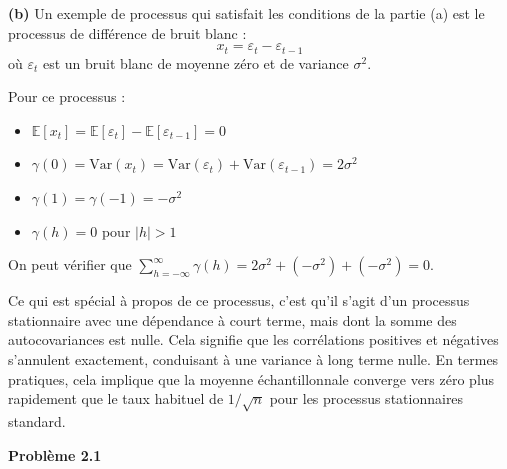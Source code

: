 \documentclass{homework}
\begin{document}
\textbf{(b)} Un exemple de processus qui satisfait les conditions de la partie (a) est le processus de différence de bruit blanc :
\[ x_t = \varepsilon_t - \varepsilon_{t-1} \]
où $\varepsilon_t$ est un bruit blanc de moyenne zéro et de variance $\sigma^2$.

Pour ce processus :
\begin{itemize}
    \item $\mathbb{E}[x_t] = \mathbb{E}[\varepsilon_t] - \mathbb{E}[\varepsilon_{t-1}] = 0$
    \item $\gamma(0) = \text{Var}(x_t) = \text{Var}(\varepsilon_t) + \text{Var}(\varepsilon_{t-1}) = 2\sigma^2$
    \item $\gamma(1) = \gamma(-1) = -\sigma^2$
    \item $\gamma(h) = 0$ pour $|h| > 1$
\end{itemize}

On peut vérifier que $\sum_{h=-\infty}^{\infty} \gamma(h) = 2\sigma^2 + (-\sigma^2) + (-\sigma^2) = 0$.

Ce qui est spécial à propos de ce processus, c'est qu'il s'agit d'un processus stationnaire avec une dépendance à court terme, mais dont la somme des autocovariances est nulle. Cela signifie que les corrélations positives et négatives s'annulent exactement, conduisant à une variance à long terme nulle. En termes pratiques, cela implique que la moyenne échantillonnale converge vers zéro plus rapidement que le taux habituel de $1/\sqrt{n}$ pour les processus stationnaires standard.

\newpage
\textbf{\Large{Problème 2.1}}
\end{document}
